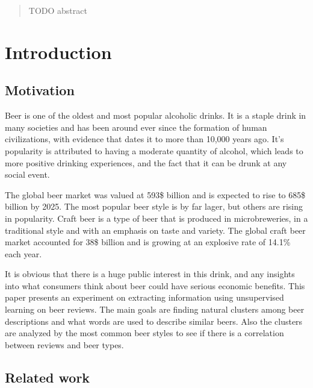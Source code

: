 \documentclass[12pt]{article}
\begin{document}
	\title{}
	\author{Stefan Sebastian, 242}
	\date{}
	\maketitle
	
	\begin{abstract}
	TODO abstract
	\end{abstract}

	\newpage
	\tableofcontents
	\newpage
	
	\section{Introduction}
	\subsection{Motivation}
	Beer is one of the oldest and most popular alcoholic drinks. It is a staple drink in many societies and has been around ever since the formation of human civilizations, with evidence that dates it to more than 10,000 years ago\cite{BeerArticleTime}. It's popularity is attributed to having a moderate quantity of alcohol, which leads to more positive drinking experiences, and the fact that it can be drunk at any social event\cite{BeerArticleTime}.
	
	The global beer market was valued at 593\$ billion and is expected to rise to 685\$ billion by 2025\cite{BeerStats}. The most popular beer style is by far lager, but others are rising in popularity. Craft beer is a type of beer that is produced in microbreweries, in a traditional style and with an emphasis on taste and variety. The global craft beer market accounted for 38\$ billion and is growing at an explosive rate of 14.1\% each year\cite{CraftBeerStats}.
	
	 It is obvious that there is a huge public interest in this drink, and any insights into what consumers think about beer could have serious economic benefits. This paper presents an experiment on extracting information using unsupervised learning on beer reviews. The main goals are finding natural clusters among beer descriptions and what words are used to describe similar beers. Also the clusters are analyzed by the most common beer styles to see if there is a correlation between reviews and beer types.
	
	\subsection{Related work}
	
\end{document}
